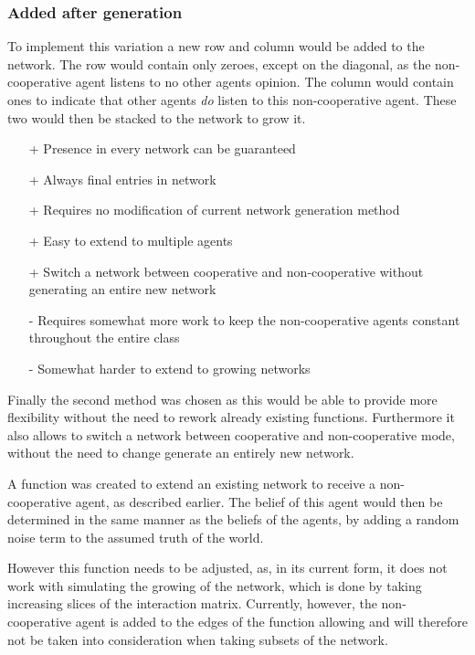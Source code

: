 \documentclass{article}
\begin{document}
\newpage

\subsubsection*{Added after generation}
To implement this variation a new row and column would be added to the network. The row would contain only zeroes, except on the diagonal, as the non-cooperative agent listens to no other agents opinion. The column would contain ones to indicate that other agents \emph{do} listen to this non-cooperative agent. These two would then be stacked to the network to grow it.
\begin{itemize} 
    \item[+] Presence in every network can be guaranteed
    \item[+] Always final entries in network
    \item[+] Requires no modification of current network generation method
    \item[+] Easy to extend to multiple agents
    \item[+] Switch a network between cooperative and non-cooperative without generating an entire new network
    \item[-] Requires somewhat more work to keep the non-cooperative agents constant throughout the entire class
    \item[-] Somewhat harder to extend to growing networks
\end{itemize}

Finally the second method was chosen as this would be able to provide more flexibility without the need to rework already existing functions. Furthermore it also allows to switch a network between cooperative and non-cooperative mode, without the need to change generate an entirely new network. \newline

A function was created to extend an existing network to receive a non-cooperative agent, as described earlier. The belief of this agent would then be determined in the same manner as the beliefs of the agents, by adding a random noise term to the assumed truth of the world.

However this function needs to be adjusted, as, in its current form, it does not work with simulating the growing of the network, which is done by taking increasing slices of the interaction matrix. Currently, however, the non-cooperative agent is added to the edges of the function allowing and will therefore not be taken into consideration when taking subsets of the network.
\end{document}
